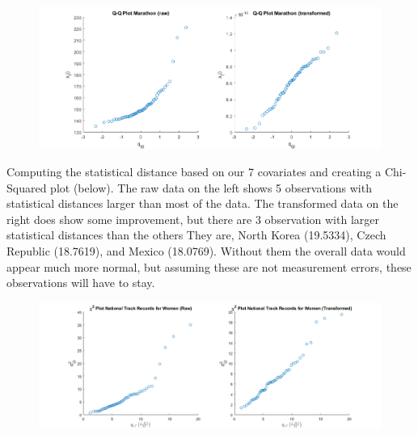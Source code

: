 \begin{center}
    \begin{figure}[H]
        \centering
        \includegraphics[scale=0.4]{./matlab/chapter-4/sol4.36.qq.7.png}
    \end{figure}
\end{center}

Computing the statistical distance based on our 7 covariates and creating a Chi-Squared plot (below). The raw data on the left  shows 5 observations with statistical distances larger than most of the data. The transformed data on the right does show some improvement, but there are 3 observation with larger statistical distances than the others They are, North Korea (19.5334), Czech Republic (18.7619), and Mexico (18.0769). Without them the overall data would appear much more normal, but assuming these are not measurement errors, these observations will have to stay.

\begin{center}
    \begin{figure}[H]
        \centering
        \includegraphics[scale=0.4]{./matlab/chapter-4/sol4.36.chi2.png}
    \end{figure}
\end{center}


